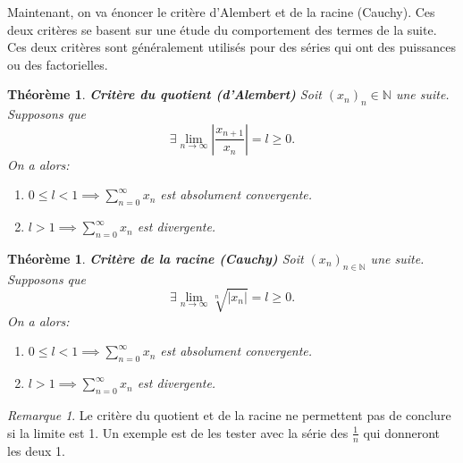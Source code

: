 \documentclass[oneside,12pt,french,table]{book}
\theoremstyle{definition}
\theoremstyle{plain}
\newtheorem{theorem}[definition]{Théorème}
\theoremstyle{remark}
\newtheorem{remark}[definition]{Remarque}
\newcommand{\Nn}{{\mathbb{N}}}
\begin{document}
Maintenant, on va énoncer le critère d'Alembert et de la racine (Cauchy).
Ces deux critères se basent sur une étude du comportement des termes de la suite. Ces deux critères sont généralement utilisés pour des séries qui ont des puissances ou des factorielles.

\begin{theorem}{\textbf{Critère du quotient (d'Alembert)}}
    Soit $(x_n)_n\in\Nn$ une suite. Supposons que
    \begin{equation}
        \exists \lim_{n\rightarrow\infty} \left|\frac{x_{n+1}}{x_n}\right|=l\geq 0.
    \end{equation}
    On a alors:
    \begin{enumerate}
        \item $0\leq l<1 \implies \sum_{n=0}^\infty x_n$ est absolument convergente.
        \item $l>1 \implies \sum_{n=0}^\infty x_n$ est divergente.
    \end{enumerate}
\end{theorem}



\begin{theorem}{\textbf{Critère de la racine (Cauchy)}}
    Soit $(x_n)_{n\in\Nn}$ une suite. Supposons que
    \begin{equation}
        \exists \lim_{n\rightarrow\infty} \sqrt[n]{|x_n|}=l\geq0.
    \end{equation}
    On a alors:
    \begin{enumerate}
        \item $0\leq l<1 \implies \sum_{n=0}^\infty x_n$ est absolument convergente.
        \item $l>1 \implies \sum_{n=0}^\infty x_n$ est divergente.
    \end{enumerate}
\end{theorem}

\begin{remark}
    Le critère du quotient et de la racine ne permettent pas de conclure si la limite est 1. Un exemple est de les tester avec la série des $\frac{1}{n}$ qui donneront les deux 1.
\end{remark}
\end{document}
